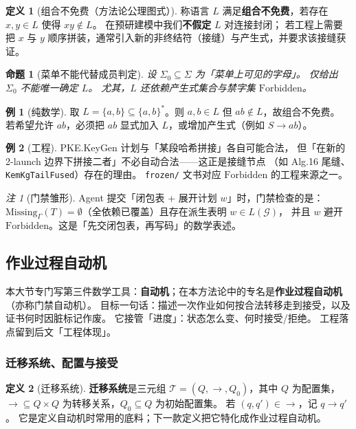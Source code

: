 \documentclass[UTF8,a4paper,11pt]{ctexart}
\theoremstyle{definition}
\newtheorem{definition}{定义}[section]
\newtheorem{example}{例}[section]
\theoremstyle{plain}
\newtheorem{proposition}{命题}[section]
\theoremstyle{remark}
\newtheorem{remark}{注}[section]
\numberwithin{figure}{section}
\numberwithin{table}{section}
\begin{document}
\begin{definition}[组合不免费（方法论公理图式）]
称语言 $L$ 满足\textbf{组合不免费}，若存在 $x,y\in L$ 使得 $xy\notin L$。
在预研建模中我们\textbf{不假定} $L$ 对连接封闭；
若工程上需要把 $x$ 与 $y$ 顺序拼装，通常引入新的非终结符（接缝）与产生式，并要求该接缝获证。
\end{definition}

\begin{proposition}[菜单不能代替成员判定]
设 $\Sigma_0\subseteq\Sigma$ 为「菜单上可见的字母」。
仅给出 $\Sigma_0$ 不能唯一确定 $L$。
尤其，$L$ 还依赖产生式集合与禁字集 $\mathrm{Forbidden}$。
\end{proposition}

\begin{example}[纯数学]
取 $L=\{a,b\}\subseteq\{a,b\}^*$。则 $a,b\in L$ 但 $ab\notin L$，故组合不免费。
若希望允许 $ab$，必须把 $ab$ 显式加入 $L$，或增加产生式（例如 $S\to ab$）。
\end{example}

\begin{example}[工程]
PKE.KeyGen 计划与「某段哈希拼接」各自可能合法，
但「在新的 2-launch 边界下拼接二者」不必自动合法——这正是接缝节点
（如 Alg.16 尾缝、\texttt{KemKgTailFused}）存在的理由。
\texttt{frozen/} 文书对应 $\mathrm{Forbidden}$ 的工程来源之一。
\end{example}

\begin{remark}[门禁雏形]
Agent 提交「闭包表 + 展开计划 $w$」时，门禁检查的是：
$\mathrm{Missing}_\Gamma(T)=\emptyset$（全依赖已覆盖）且存在派生表明 $w\in L(\mathcal{G})$，
并且 $w$ 避开 $\mathrm{Forbidden}$。这是「先交闭包表，再写码」的数学表述。
\end{remark}


\subsection{作业过程自动机}
\label{sec:tool-auto}
\label{sec:transition}

本大节专门写第三件数学工具：\textbf{自动机}；在本方法论中的专名是\textbf{作业过程自动机}（亦称门禁自动机）。
目标一句话：描述一次作业如何按合法转移走到接受，以及证书何时因脏标记作废。
它接管「进度」：状态怎么变、何时接受/拒绝。
工程落点留到后文「工程体现」。

\subsubsection{迁移系统、配置与接受}
\begin{definition}[迁移系统]
\textbf{迁移系统}是三元组 $\mathcal{T}=(Q,\to,Q_0)$，其中 $Q$ 为配置集，
$\to\subseteq Q\times Q$ 为转移关系，$Q_0\subseteq Q$ 为初始配置集。
若 $(q,q')\in{\to}$，记 $q\to q'$。
它是定义自动机时常用的底料；下一款定义把它特化成作业过程自动机。
\end{definition}
\end{document}
